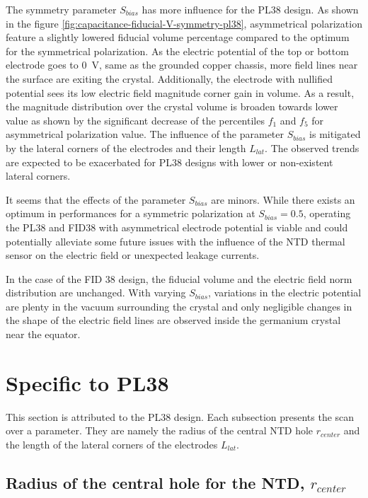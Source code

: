 The symmetry parameter $S_{bias}$ has more influence for the PL38 design. As shown in the figure \ref{fig:capacitance-fiducial-V-symmetry-pl38}, asymmetrical polarization feature a slightly lowered fiducial volume percentage compared to the optimum for the symmetrical polarization. As the electric potential of the top or bottom electrode goes to \SI{0}{\volt}, same as the grounded copper chassis, more field lines near the surface are exiting the crystal. Additionally, the electrode with nullified potential sees its low electric field magnitude corner gain in volume. As a result, the magnitude distribution over the crystal volume is broaden towards lower value as shown by the significant decrease of the percentiles $f_1$ and $f_5$ for asymmetrical polarization value.
The influence of the parameter $S_{bias}$ is mitigated by the lateral corners of the electrodes and their length $L_{lat}$. The observed trends are expected to be exacerbated for PL38 designs with lower or non-existent lateral corners.

It seems that the effects of the parameter $S_{bias}$ are minors. While there exists an optimum in performances for a symmetric polarization at $S_{bias}=\num{0.5}$, operating the PL38 and FID38 with asymmetrical electrode potential is viable and could potentially alleviate some future issues with the influence of the NTD thermal sensor on the electric field or unexpected leakage currents.

In the case of the FID 38 design, the fiducial volume and the electric field norm distribution are unchanged. With varying $S_{bias}$, variations in the electric potential are plenty in the vacuum surrounding the crystal and only negligible changes in the shape of the electric field lines are observed inside the germanium crystal near the equator.


\section{Specific to PL38}

This section is attributed to the PL38 design. Each subsection presents the scan over a parameter. They are namely the radius of the central NTD hole $r_{center}$ and the length of the lateral corners of the electrodes $L_{lat}$.


\subsection{Radius of the central hole for the NTD, $r_{center}$}

